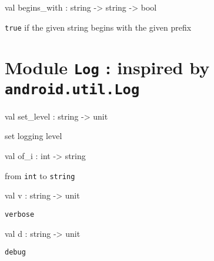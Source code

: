 \documentclass[11pt]{article}
\begin{document}
\label{val:Util.begins-underscorewith}\begin{ocamldoccode}
val begins_with : string -> string -> bool
\end{ocamldoccode}
\begin{ocamldocdescription}
{\tt{true}} if the given string begins with the given prefix


\end{ocamldocdescription}


\section{Module {\tt{Log}} : inspired by {\tt{android.util.Log}}}
\label{module:Log}




\ocamldocvspace{0.5cm}



\label{val:Log.set-underscorelevel}\begin{ocamldoccode}
val set_level : string -> unit
\end{ocamldoccode}
\begin{ocamldocdescription}
set logging level


\end{ocamldocdescription}




\label{val:Log.of-underscorei}\begin{ocamldoccode}
val of_i : int -> string
\end{ocamldoccode}
\begin{ocamldocdescription}
from {\tt{int}} to {\tt{string}}


\end{ocamldocdescription}




\label{val:Log.v}\begin{ocamldoccode}
val v : string -> unit
\end{ocamldoccode}
\begin{ocamldocdescription}
{\tt{verbose}}


\end{ocamldocdescription}




\label{val:Log.d}\begin{ocamldoccode}
val d : string -> unit
\end{ocamldoccode}
\begin{ocamldocdescription}
{\tt{debug}}


\end{ocamldocdescription}
\end{document}
